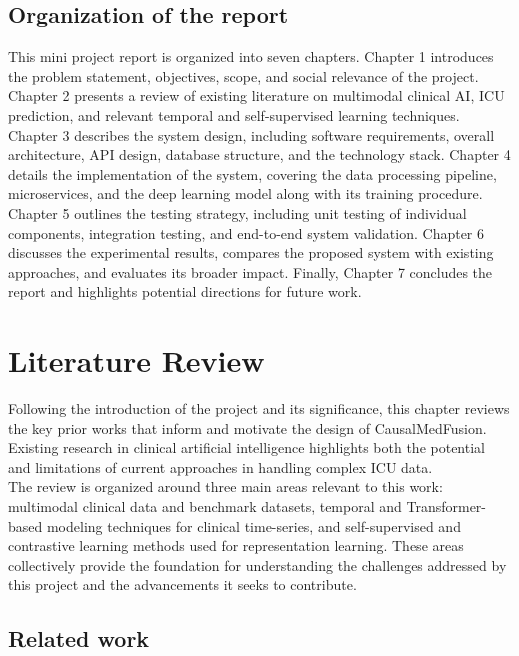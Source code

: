 \documentclass{fisatprojectfinal}
\begin{document}
\section{Organization of the report}
This mini project report is organized into seven chapters. Chapter 1 introduces the problem statement, objectives, scope, and social relevance of the project. Chapter 2 presents a review of existing literature on multimodal clinical AI, ICU prediction, and relevant temporal and self-supervised learning techniques. \\

Chapter 3 describes the system design, including software requirements, overall architecture, API design, database structure, and the technology stack. Chapter 4 details the implementation of the system, covering the data processing pipeline, microservices, and the deep learning model along with its training procedure. \\

Chapter 5 outlines the testing strategy, including unit testing of individual components, integration testing, and end-to-end system validation. Chapter 6 discusses the experimental results, compares the proposed system with existing approaches, and evaluates its broader impact. Finally, Chapter 7 concludes the report and highlights potential directions for future work. 

\chapter{Literature Review}
Following the introduction of the project and its significance, this chapter reviews the key prior works that inform and motivate the design of CausalMedFusion. Existing research in clinical artificial intelligence highlights both the potential and limitations of current approaches in handling complex ICU data. \\ 

The review is organized around three main areas relevant to this work: multimodal clinical data and benchmark datasets, temporal and Transformer-based modeling techniques for clinical time-series, and self-supervised and contrastive learning methods used for representation learning. These areas collectively provide the foundation for understanding the challenges addressed by this project and the advancements it seeks to contribute.

\section{Related work}
\end{document}

